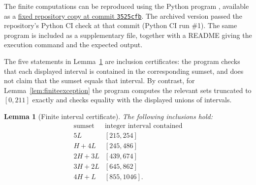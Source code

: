 \documentclass[12pt]{article}
\theoremstyle{plain}
\newtheorem{lemma}[theorem]{Lemma}
\theoremstyle{definition}
\theoremstyle{plain}
\begin{document}
The finite computations can be reproduced using the Python program
, available as a
\href{https://github.com/growupkuriyama-hub/lean_cfg_project/blob/3525cfb/LeanCfgProject/PrimDyck/verify_certificates_for_paper.py}{fixed repository copy at commit \texttt{3525cfb}}.
The archived version passed the repository's Python CI check at that commit
(Python CI run \#1).  The same program is included as a supplementary file,
together with a README giving the execution command and the expected output.

The five statements in Lemma~\ref{lem:finitefive} are inclusion
certificates: the program checks that each displayed interval is
contained in the corresponding sumset, and does not claim that the
sumset equals that interval.  By contrast, for
Lemma~\ref{lem:finiteexception} the program computes the relevant sets
truncated to $[0,211]$ exactly and checks equality with the displayed
unions of intervals.

\begin{lemma}[Finite interval certificate]\label{lem:finitefive}
The following inclusions hold:
\begin{equation}\label{eq:finite-interval-certificate}
\begin{array}{c|c}
\text{sumset}&\text{integer interval contained}\\ \hline
5L &[215,254]\\
H+4L &[245,486]\\
2H+3L &[439,674]\\
3H+2L &[645,862]\\
4H+L &[855,1046].
\end{array}
\end{equation}
\end{lemma}
\end{document}
